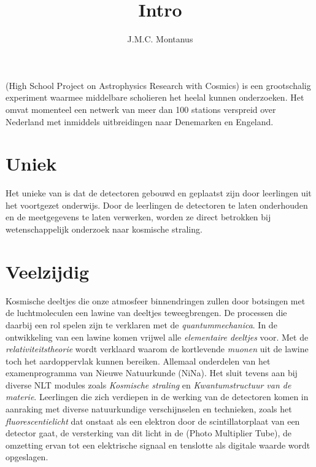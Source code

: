

\title{Intro}
\author{J.M.C. Montanus}



\maketitle

\section{\hisparc}

\hisparc (High School Project on Astrophysics Research with Cosmics) is
een grootschalig experiment waarmee middelbare scholieren het heelal
kunnen onderzoeken. Het omvat momenteel een netwerk van meer dan 100
stations verspreid over Nederland met inmiddels uitbreidingen naar
Denemarken en Engeland. 


\section{Uniek}

Het unieke van \hisparc is dat de detectoren gebouwd en geplaatst zijn
door leerlingen uit het voortgezet onderwijs. Door de leerlingen de detectoren te laten onderhouden en de
meetgegevens te laten verwerken, worden ze direct betrokken bij
wetenschappelijk onderzoek naar kosmische straling. 


\section{Veelzijdig}

Kosmische deeltjes die onze atmosfeer binnendringen zullen door
botsingen met de luchtmoleculen een lawine van deeltjes teweegbrengen. De
processen die daarbij een rol spelen zijn te verklaren met de
\emph{quantummechanica}. In de ontwikkeling van een lawine komen vrijwel
alle \emph{elementaire deeltjes} voor. Met de
\emph{relativiteitstheorie} wordt verklaard waarom de kortlevende
\emph{muonen} uit de lawine toch het aardoppervlak kunnen bereiken. Allemaal onderdelen van het examenprogramma van Nieuwe Natuurkunde (NiNa). Het sluit tevens aan bij diverse NLT modules zoals \emph{Kosmische straling} en \emph{Kwantumstructuur van de materie}. Leerlingen die zich verdiepen in de werking van de detectoren komen in aanraking met diverse natuurkundige verschijnselen en technieken, zoals het
\emph{fluorescentielicht} dat onstaat als een elektron door de
scintillatorplaat van een \hisparc detector gaat, de versterking van dit
licht in de \pmt (Photo Multiplier Tube), de omzetting ervan tot een
elektrische signaal en tenslotte als digitale waarde wordt opgeslagen.      


